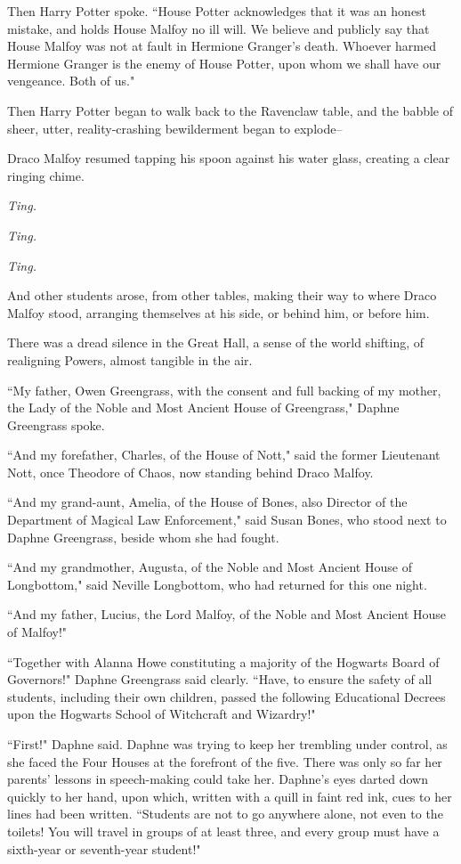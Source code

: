 Then Harry Potter spoke. ``House Potter acknowledges that it was an honest mistake, and holds House Malfoy no ill will. We believe and publicly say that House Malfoy was not at fault in Hermione Granger's death. Whoever harmed Hermione Granger is the enemy of House Potter, upon whom we shall have our vengeance. Both of us."

Then Harry Potter began to walk back to the Ravenclaw table, and the babble of sheer, utter, reality-crashing bewilderment began to explode\---

Draco Malfoy resumed tapping his spoon against his water glass, creating a clear ringing chime.

\emph{Ting.}

\emph{Ting.}

\emph{Ting.}

And other students arose, from other tables, making their way to where Draco Malfoy stood, arranging themselves at his side, or behind him, or before him.

There was a dread silence in the Great Hall, a sense of the world shifting, of realigning Powers, almost tangible in the air.

``My father, Owen Greengrass, with the consent and full backing of my mother, the Lady of the Noble and Most Ancient House of Greengrass," Daphne Greengrass spoke.

``And my forefather, Charles, of the House of Nott," said the former Lieutenant Nott, once Theodore of Chaos, now standing behind Draco Malfoy.

``And my grand-aunt, Amelia, of the House of Bones, also Director of the Department of Magical Law Enforcement," said Susan Bones, who stood next to Daphne Greengrass, beside whom she had fought.

``And my grandmother, Augusta, of the Noble and Most Ancient House of Longbottom," said Neville Longbottom, who had returned for this one night.

``And my father, Lucius, the Lord Malfoy, of the Noble and Most Ancient House of Malfoy!"

``Together with Alanna Howe constituting a majority of the Hogwarts Board of Governors!" Daphne Greengrass said clearly. ``Have, to ensure the safety of all students, including their own children, passed the following Educational Decrees upon the Hogwarts School of Witchcraft and Wizardry!"

\later

``First!" Daphne said. Daphne was trying to keep her trembling under control, as she faced the Four Houses at the forefront of the five. There was only so far her parents' lessons in speech-making could take her. Daphne's eyes darted down quickly to her hand, upon which, written with a quill in faint red ink, cues to her lines had been written. ``Students are not to go anywhere alone, not even to the toilets! You will travel in groups of at least three, and every group must have a sixth-year or seventh-year student!"

